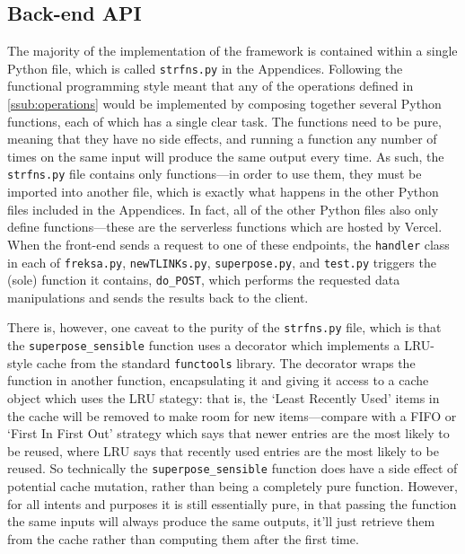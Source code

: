\documentclass[a4paper,12pt,leqno,twoside]{article}
\begin{document}
\subsection{Back-end API}\label{sub:backend} %
The majority of the implementation of the framework is contained within a single Python file, which is called \verb|strfns.py| in the Appendices. Following the functional programming style meant that any of the operations defined in \cref{ssub:operations} would be implemented by composing together several Python functions, each of which has a single clear task. The functions need to be pure, meaning that they have no side effects, and running a function any number of times on the same input will produce the same output every time. As such, the \verb|strfns.py| file contains only functions---in order to use them, they must be imported into another file, which is exactly what happens in the other Python files included in the Appendices. In fact, all of the other Python files also only define functions---these are the serverless functions which are hosted by Vercel. When the front-end sends a request to one of these endpoints, the \verb|handler| class in each of \verb|freksa.py|, \verb|newTLINKs.py|, \verb|superpose.py|, and \verb|test.py| triggers the (sole) function it contains, \verb|do_POST|, which performs the requested data manipulations and sends the results back to the client.

There is, however, one caveat to the purity of the \verb|strfns.py| file, which is that the \verb|superpose_sensible| function uses a decorator which implements a LRU-style cache from the standard \verb|functools| library. The decorator wraps the function in another function, encapsulating it and giving it access to a cache object which uses the LRU stategy: that is, the `Least Recently Used' items in the cache will be removed to make room for new items---compare with a FIFO or `First In First Out' strategy which says that newer entries are the most likely to be reused, where LRU says that recently used entries are the most likely to be reused. So technically the \verb|superpose_sensible| function does have a side effect of potential cache mutation, rather than being a completely pure function. However, for all intents and purposes it is still essentially pure, in that passing the function the same inputs will always produce the same outputs, it'll just retrieve them from the cache rather than computing them after the first time.
\end{document}
